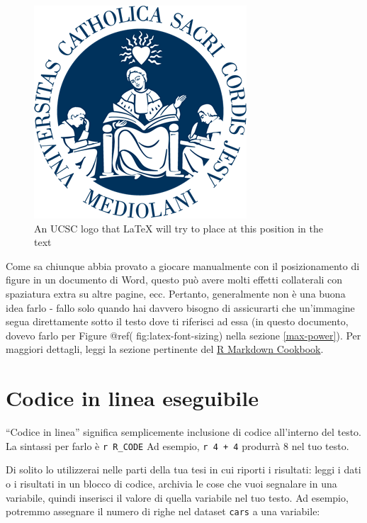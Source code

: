 \documentclass[a4paper, 11pt, nobind]{templates/ociamthesis}
\begin{document}
\begin{figure}[H]

{\centering \includegraphics[width=0.5\linewidth]{figures/sample-content/cattolica-logo} 

}

\caption{An UCSC logo that LaTeX will try to place at this position in the text}\label{fig:cattolica-logo-controlled}
\end{figure}

Come sa chiunque abbia provato a giocare manualmente con il posizionamento di figure in un documento di Word, questo può avere molti effetti collaterali con spaziatura extra su altre pagine, ecc.
Pertanto, generalmente non è una buona idea farlo - fallo solo quando hai davvero bisogno di assicurarti che un'immagine segua direttamente sotto il testo dove ti riferisci ad essa (in questo documento, dovevo farlo per Figure @ref( fig:latex-font-sizing) nella sezione \ref{max-power}).
Per maggiori dettagli, leggi la sezione pertinente del \href{https://bookdown.org/yihui/rmarkdown-cookbook/figure-placement.html}{R Markdown Cookbook}.

\hypertarget{codice-in-linea-eseguibile}{%
\section{Codice in linea eseguibile}\label{codice-in-linea-eseguibile}}

``Codice in linea'' significa semplicemente inclusione di codice all'interno del testo.
La sintassi per farlo è \texttt{\textasciigrave{}r\ R\_CODE\textasciigrave{}}
Ad esempio, \texttt{\textasciigrave{}r\ 4\ +\ 4\textasciigrave{}} produrrà 8 nel tuo testo.

Di solito lo utilizzerai nelle parti della tua tesi in cui riporti i risultati: leggi i dati o i risultati in un blocco di codice, archivia le cose che vuoi segnalare in una variabile, quindi inserisci il valore di quella variabile nel tuo testo.
Ad esempio, potremmo assegnare il numero di righe nel dataset \texttt{cars} a una variabile:
\end{document}
